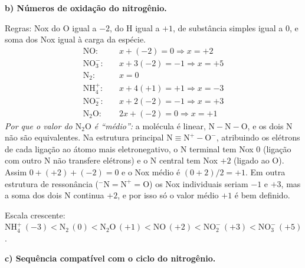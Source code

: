 \documentclass{article}%
\begin{document}
\medskip
\textbf{b) Números de oxidação do nitrogênio.}

Regras: Nox do O igual a $-2$, do H igual a $+1$, de substância simples igual a $0$, e soma dos Nox igual à carga da espécie.
\begin{align*}
\mathrm{NO}:&\quad x + (-2) = 0 \Rightarrow x = +2\\
\mathrm{NO_3^-}:&\quad x + 3(-2) = -1 \Rightarrow x = +5\\
\mathrm{N_2}:&\quad x = 0\\
\mathrm{NH_4^+}:&\quad x + 4(+1) = +1 \Rightarrow x = -3\\
\mathrm{NO_2^-}:&\quad x + 2(-2) = -1 \Rightarrow x = +3\\
\mathrm{N_2O}:&\quad 2x + (-2) = 0 \Rightarrow x = +1
\end{align*}
\emph{Por que o valor do $\mathrm{N_2O}$ é \textquotedblleft médio\textquotedblright:} a molécula é linear, $\mathrm{N}\!-\!\mathrm{N}\!-\!\mathrm{O}$, e os dois N não são equivalentes. Na estrutura principal $\mathrm{N}\!\equiv\!\mathrm{N}^{+}\!-\!\mathrm{O}^{-}$, atribuindo os elétrons de cada ligação ao átomo mais eletronegativo, o N terminal tem Nox $0$ (ligação com outro N não transfere elétrons) e o N central tem Nox $+2$ (ligado ao O). Assim $0 + (+2) + (-2) = 0$ e o Nox médio é $(0+2)/2 = +1$. Em outra estrutura de ressonância ($\mathrm{^-N}\!=\!\mathrm{N}^{+}\!=\!\mathrm{O}$) os Nox individuais seriam $-1$ e $+3$, mas a soma dos dois N continua $+2$, e por isso só o valor médio $+1$ é bem definido.

Escala crescente: $\mathrm{NH_4^+}\,(-3) < \mathrm{N_2}\,(0) < \mathrm{N_2O}\,(+1) < \mathrm{NO}\,(+2) < \mathrm{NO_2^-}\,(+3) < \mathrm{NO_3^-}\,(+5)$.

\medskip
\textbf{c) Sequência compatível com o ciclo do nitrogênio.}
\end{document}

